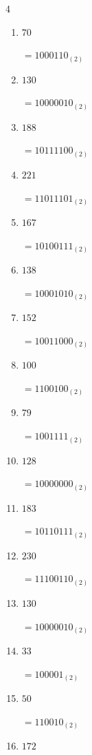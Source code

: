 \begin{multicols}{4}
\begin{enumerate}
        $=11000_{(2)}$

  \item $70$

        $=1000110_{(2)}$

  \item $130$

        $=10000010_{(2)}$

  \item $188$

        $=10111100_{(2)}$

  \item $221$

        $=11011101_{(2)}$

  \item $167$

        $=10100111_{(2)}$

  \item $138$

        $=10001010_{(2)}$

  \item $152$

        $=10011000_{(2)}$

  \item $100$

        $=1100100_{(2)}$

\columnbreak %

  \item $79$

        $=1001111_{(2)}$

  \item $128$

        $=10000000_{(2)}$

  \item $183$

        $=10110111_{(2)}$

  \item $230$

        $=11100110_{(2)}$

  \item $130$

        $=10000010_{(2)}$

  \item $33$

        $=100001_{(2)}$

  \item $50$

        $=110010_{(2)}$

  \item $172$


\end{enumerate}
\end{multicols}
